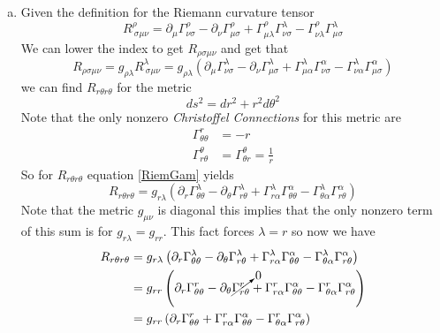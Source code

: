 \documentclass[11pt]{article}
\numberwithin{equation}{section}
\begin{document}
\begin{enumerate}[(a)]
\item
Given the definition for the Riemann curvature tensor
\begin{equation}
R^{\rho}_{\ \sigma\mu\nu} = \partial_{\mu}\Gamma^{\rho}_{\nu\sigma}-\partial_{\nu}\Gamma^{\rho}_{\mu\sigma} +\Gamma^{\rho}_{\mu\lambda}\Gamma^{\lambda}_{\nu\sigma} - \Gamma^{\rho}_{\nu\lambda}\Gamma^{\lambda}_{\mu\sigma}
\label{RiemDef}
\end{equation}
We can lower the index to get $R_{\rho\sigma\mu\nu}$ and get that
\begin{equation}
R_{\rho\sigma\mu\nu} = g_{\rho\lambda}R^{\lambda}_{\ \sigma\mu\nu} = g_{\rho\lambda}\left(\partial_{\mu}\Gamma^{\lambda}_{\nu\sigma}-\partial_{\nu}\Gamma^{\lambda}_{\mu\sigma} +\Gamma^{\lambda}_{\mu\alpha}\Gamma^{\alpha}_{\nu\sigma} - \Gamma^{\lambda}_{\nu\alpha}\Gamma^{\alpha}_{\mu\sigma}\right)
\label{RiemGam}
\end{equation}
we can find $R_{r\theta r\theta}$ for the metric 
$$ds^2 = dr^2 + r^2d\theta^2$$
Note that the only nonzero \emph{Christoffel Connections} for this metric are
\begin{align*}
\Gamma^{r}_{\theta\theta} &= -r\\
\Gamma^{\theta}_{r\theta} &= \Gamma^{\theta}_{\theta r} = \frac{1}{r}
\end{align*}
So for $R_{r\theta r\theta}$ equation \ref{RiemGam} yields
$$R_{r\theta r\theta} = g_{r\lambda}\left(\partial_{r}\Gamma^{\lambda}_{\theta\theta}-\partial_{\theta}\Gamma^{\lambda}_{r\theta} +\Gamma^{\lambda}_{r\alpha}\Gamma^{\alpha}_{\theta\theta} - \Gamma^{\lambda}_{\theta\alpha}\Gamma^{\alpha}_{r\theta}\right)$$
Note that the metric $g_{\mu\nu}$ is diagonal this implies that the only nonzero term of this sum is for $g_{r\lambda} = g_{rr}$. This fact forces $\lambda = r$ so now we have
\begin{align*}
R_{r\theta r\theta} &= g_{r\lambda}\left(\partial_{r}\Gamma^{\lambda}_{\theta\theta}-\partial_{\theta}\Gamma^{\lambda}_{r\theta} +\Gamma^{\lambda}_{r\alpha}\Gamma^{\alpha}_{\theta\theta} - \Gamma^{\lambda}_{\theta\alpha}\Gamma^{\alpha}_{r\theta}\right)\\
&= g_{rr}\left(\partial_{r}\Gamma^{r}_{\theta\theta}-\partial_{\theta}\cancelto{0}{\Gamma^{r}_{r\theta}} +\Gamma^{r}_{r\alpha}\Gamma^{\alpha}_{\theta\theta} - \Gamma^{r}_{\theta\alpha}\Gamma^{\alpha}_{r\theta}\right)\\
&= g_{rr}\left(\partial_{r}\Gamma^{r}_{\theta\theta} + \Gamma^{r}_{r\alpha}\Gamma^{\alpha}_{\theta\theta} - \Gamma^{r}_{\theta\alpha}\Gamma^{\alpha}_{r\theta}\right)

\end{align*}
\end{enumerate}
\end{document}
